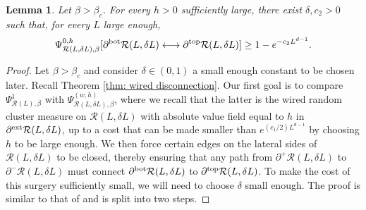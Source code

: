 \documentclass[11pt,a4paper]{article}
\numberwithin{equation}{section}
\theoremstyle{plain}
\newtheorem{Lem}[Thm]{Lemma}
\theoremstyle{definition}
\begin{document}
\begin{Lem}\label{lem: strip to rectangle}
Let $\beta>\beta_c$. For every $h>0$ sufficiently large, there exist $\delta,c_2>0$ such that, for every $L$ large enough,
\begin{equation}
\Psi^{0,h}_{\mathcal R(L,\delta L),\beta}[\partial^{{\rm bot}} \mathcal R(L, \delta L) \longleftrightarrow\partial^{{\rm top}} \mathcal R(L, \delta L)] \geq 1 - e^{-c_2 L^{d-1}}. 
\end{equation}
\end{Lem}
\begin{proof}
Let $\beta>\beta_c$ and consider $\delta\in (0,1)$ a small enough constant to be chosen later. Recall Theorem \ref{thm: wired disconnection}. Our first goal is to compare $\Psi^1_{\mathcal R(L),\beta}$ with $\Psi^{(w,h)}_{\mathcal{R}(L,\delta L),\beta}$, where we recall that the latter is the wired random cluster measure on $\mathcal{R}(L,\delta L)$ with absolute value field equal to $h$ in $\partial^{\textup{ext}}\mathcal{R}(L,\delta L)$, up to a cost that can be made smaller than $e^{(c_1/2)L^{d-1}}$ by choosing $h$ to be large enough. We then force certain edges on the lateral sides of $\mathcal{R}(L,\delta L)$ to be closed, thereby ensuring that any path from $\partial^{+}\mathcal R(L,\delta L)$ to $\partial^{-}\mathcal R(L,\delta L)$ must connect $\partial^{\rm bot}\mathcal R(L,\delta L)$ to $\partial^{\rm top}\mathcal R(L,\delta L)$. To make the cost of this surgery sufficiently small, we will need to choose $\delta$ small enough. The proof is similar to that of \cite[Lemma 5.8]{gunaratnam2025supercritical} and is split into two steps. 


\end{proof}
\end{document}
